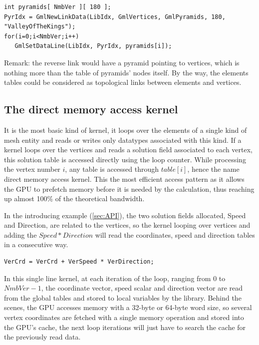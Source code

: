 \documentclass[a4paper,12pt]{article}
\begin{document}
\begin{tt}
\begin{verbatim}
int pyramids[ NmbVer ][ 180 ];
PyrIdx = GmlNewLinkData(LibIdx, GmlVertices, GmlPyramids, 180, "ValleyOfTheKings");
for(i=0;i<NmbVer;i++)
   GmlSetDataLine(LibIdx, PyrIdx, pyramids[i]);
\end{verbatim}
\end{tt}
\normalfont

Remark: the reverse link would have a pyramid pointing to vertices, which is nothing more than the table of pyramids' nodes itself. By the way, the elements tables could be considered as topological links between elements and vertices.

\subsection{The direct memory access kernel}
\label{sec:kernels_directs}
It is the most basic kind of kernel, it loops over the elements of a single kind of mesh entity and reads or writes only datatypes associated with this kind. If a kernel loops over the vertices and reads a solution field associated to each vertex, this solution table is accessed directly using the loop counter. While processing the vertex number $i$, any table is accessed through $table[i]$, hence the name direct memory access kernel. This the most efficient access pattern as it allows the GPU to prefetch memory before it is needed by the calculation, thus reaching up almost 100\% of the theoretical bandwidth.

In the introducing example (\ref{sec:API}), the two solution fields allocated, Speed and Direction, are related to the vertices, so the kernel looping over vertices and adding the $Speed * Direction$ will read the coordinates, speed and direction tables in a consecutive way.

\begin{tt}
\begin{verbatim}
VerCrd = VerCrd + VerSpeed * VerDirection;
\end{verbatim}
\end{tt}
\normalfont

In this single line kernel, at each iteration of the loop, ranging from $0$ to $NmbVer-1$, the coordinate vector, speed scalar and direction vector are read from the global tables and stored to local variables by the library. Behind the scenes, the GPU accesses memory with a 32-byte or 64-byte word size, so several vertex coordinates are fetched with a single memory operation and stored into the GPU's cache, the next loop iterations will just have to search the cache for the previously read data.
\end{document}
